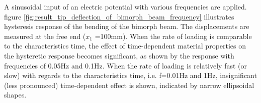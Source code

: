 A sinusoidal input of an electric potential with various frequencies are applied.
figure \ref{fig:result_tip_deflection_of_bimorph_beam_frequency} illustrates hysteresis response of the bending of the bimorph beam.
The displacements are measured at the free end ($x_1$ =100mm).
When the rate of loading is comparable to the characteristics time,
the effect of time-dependent material properties on the hysteretic response becomes significant,
as shown by the response with frequencies of 0.05Hz and 0.1Hz.
When the rate of loading is relatively fast (or slow) with regards to the characteristics time, i.e. f=0.01Hz and 1Hz,
 insignificant (less pronounced) time-dependent effect is shown, indicated by narrow ellipsoidal shapes.
\\








